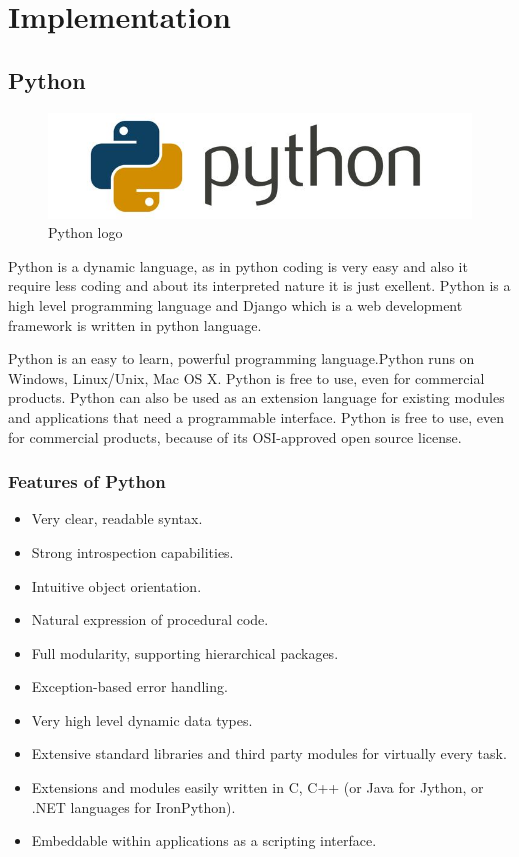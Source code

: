 \chapter{Implementation}

\section{Python}
\begin{figure}[h]
\centering \includegraphics[scale=0.3]{images/python.jpg}
\caption{Python logo}
\end{figure}
\noindent Python is a dynamic language, as in python coding is very easy and 
also it require less coding and about its interpreted nature it is 
just exellent. Python is a high level programming language and Django 
which is a web development framework is written in python language.

Python is an easy to learn, powerful programming language.Python runs 
on Windows, Linux/Unix, Mac OS X. Python is free to use, even for 
commercial products. Python can also be used as an extension language 
for existing modules and applications that need a programmable interface.  
Python is free to use, even for commercial products, because of its 
OSI-approved open source license.
\subsection{Features of Python}
\begin{itemize}
\item Very clear, readable syntax.
\item Strong introspection capabilities.
\item Intuitive object orientation.
\item Natural expression of procedural code.
\item Full modularity, supporting hierarchical packages.
\item Exception-based error handling.
\item Very high level dynamic data types.
\item Extensive standard libraries and third party modules for virtually every task.
\item Extensions and modules easily written in C, C++ (or Java for Jython, or .NET languages for IronPython).
\item Embeddable within applications as a scripting interface.
\end{itemize}
